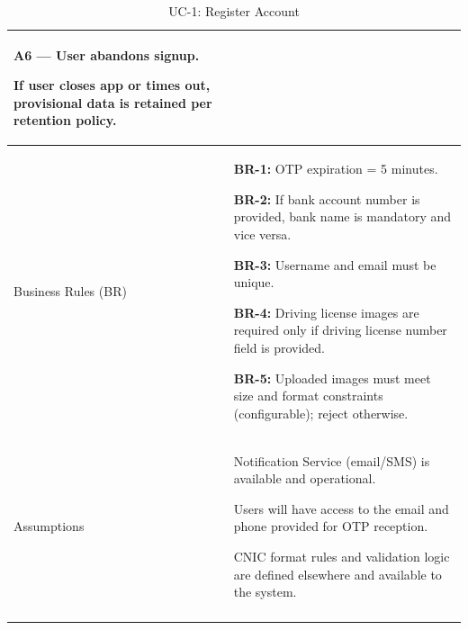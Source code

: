 \begin{longtable}{|p{3.5cm}|p{12cm}|}
\textbf{A6 --- User abandons signup.}

If user closes app or times out, provisional data is retained per retention policy. \\
\hline
Business Rules (BR) & 
\textbf{BR-1:} OTP expiration = 5 minutes.

\textbf{BR-2:} If bank account number is provided, bank name is mandatory and vice versa.

\textbf{BR-3:} Username and email must be unique.

\textbf{BR-4:} Driving license images are required only if driving license number field is provided.

\textbf{BR-5:} Uploaded images must meet size and format constraints (configurable); reject otherwise. \\
\hline
Assumptions & 
Notification Service (email/SMS) is available and operational.

Users will have access to the email and phone provided for OTP reception.

CNIC format rules and validation logic are defined elsewhere and available to the system. \\
\hline
\caption{UC-1: Register Account}
\end{longtable}


